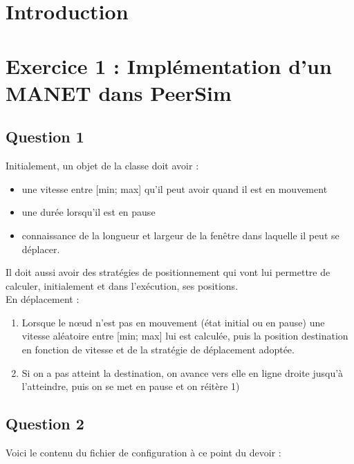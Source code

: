 \documentclass[10pt]{report}
\begin{document}
\tableofcontents
\newpage
\sectionfont{\scshape}
\section{Introduction}

\newpage

\section{Exercice 1 : Implémentation d'un MANET dans PeerSim}

\subsection{Question 1}

Initialement, un objet de la classe doit avoir :
\begin{itemize}
\item une vitesse entre [min; max] qu'il peut avoir quand il est en mouvement
\item une durée lorsqu'il est en pause
\item connaissance de la longueur et largeur de la fenêtre dans laquelle il peut se déplacer.
\end{itemize}

Il doit aussi avoir des stratégies de positionnement qui vont lui permettre de calculer, initialement et dans l'exécution, ses positions.\\

En déplacement :
\begin{enumerate}
\item Lorsque le nœud n'est pas en mouvement (état initial ou en pause) une vitesse aléatoire entre [min; max] lui est calculée, puis la position destination en fonction de vitesse et de la stratégie de déplacement adoptée.
\item Si on a pas atteint la destination, on avance vers elle en ligne droite jusqu'à l'atteindre, puis on se met en pause et on réitère 1)
\end{enumerate}

\subsection{Question 2}
Voici le contenu du fichier de configuration à ce point du devoir :
\end{document}
